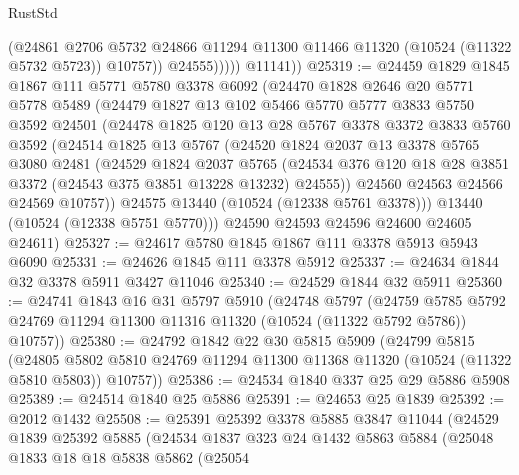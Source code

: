 \begin{lexlean}{RustStd}
\begin{coremodule}
                    (@24861
                      @2706
                      @5732
                      @24866
                      @11294
                      @11300
                      @11466
                      @11320
                      (@10524 (@11322 @5732 @5723))
                      @10757))
                  @24555)))))
        @11141))
@25319 := @24459
    @1829
    @1845
    @1867
    @111
    @5771
    @5780
    @3378
    @6092
    (@24470
      @1828
      @2646
      @20
      @5771
      @5778
      @5489
      (@24479
        @1827
        @13
        @102
        @5466
        @5770
        @5777
        @3833
        @5750
        @3592
        @24501
        (@24478
          @1825
          @120
          @13
          @28
          @5767
          @3378
          @3372
          @3833
          @5760
          @3592
          (@24514
            @1825
            @13
            @5767
            (@24520
              @1824
              @2037
              @13
              @3378
              @5765
              @3080
              @2481
              (@24529
                @1824
                @2037
                @5765
                (@24534 @376 @120 @18 @28 @3851 @3372 (@24543 @375 @3851 @13228 @13232) @24555))
              @24560
              @24563
              @24566
              @24569
              @10757))
          @24575
          @13440
          (@10524 (@12338 @5761 @3378)))
        @13440
        (@10524 (@12338 @5751 @5770)))
      @24590
      @24593
      @24596
      @24600
      @24605
      @24611)
@25327 := @24617 @5780 @1845 @1867 @111 @3378 @5913 @5943 @6090
@25331 := @24626 @1845 @111 @3378 @5912
@25337 := @24634 @1844 @32 @3378 @5911 @3427 @11046
@25340 := @24529 @1844 @32 @5911
@25360 := @24741
    @1843
    @16
    @31
    @5797
    @5910
    (@24748
      @5797
      (@24759 @5785 @5792 @24769 @11294 @11300 @11316 @11320 (@10524 (@11322 @5792 @5786)) @10757))
@25380 := @24792
    @1842
    @22
    @30
    @5815
    @5909
    (@24799
      @5815
      (@24805 @5802 @5810 @24769 @11294 @11300 @11368 @11320 (@10524 (@11322 @5810 @5803)) @10757))
@25386 := @24534 @1840 @337 @25 @29 @5886 @5908
@25389 := @24514 @1840 @25 @5886
@25391 := @24653 @25 @1839
@25392 := @2012 @1432
@25508 := @25391
    @25392
    @3378
    @5885
    @3847
    @11044
    (@24529
      @1839
      @25392
      @5885
      (@24534
        @1837
        @323
        @24
        @1432
        @5863
        @5884
        (@25048
          @1833
          @18
          @18
          @5838
          @5862
          (@25054

\end{coremodule}
\end{lexlean}
